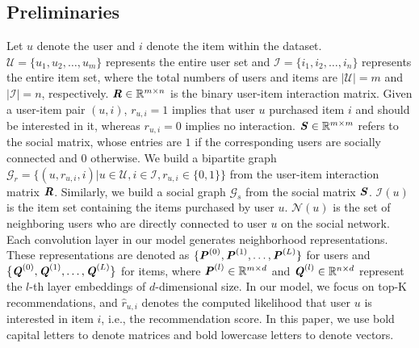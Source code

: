\documentclass[letterpaper]{article} %
\begin{document}
\subsection{Preliminaries}
Let $u$ denote the user and $i$ denote the item within the dataset. $\mathcal{U}=\{u_1,  u_2, \ldots, u_m\}$ represents the entire user set and $\mathcal{I}=\{i_1, i_2, \ldots, i_n\}$ represents the entire item set, where the total numbers of users and items are $|\mathcal{U}|=m$ and $|\mathcal{I}|=n$, respectively. $\textbf{\textit{R}} \in \mathbb{R}^{m\times n}$ is the binary user-item interaction matrix. Given a user-item pair $(u, i)$, $r_{u,i}=1$ implies that user $u$ purchased item $i$ and should be interested in it, whereas $r_{u,i}=0$ implies no interaction. $\textbf{\textit{S}} \in \mathbb{R}^{m\times m}$ refers to the social matrix, whose entries are $1$ if the corresponding users are socially connected and $0$ otherwise. We build a bipartite graph $\mathcal{G}_r=\{(u, r_{u,i}, i)|u\in \mathcal{U}, i\in \mathcal{I}, r_{u,i}\in \{0,1\}\}$ from the user-item interaction matrix $\textbf{\textit{R}}$. Similarly, we build a social graph $\mathcal{G}_s$ from the social matrix $\textbf{\textit{S}}$. $\mathcal{I}(u)$ is the item set containing the items purchased by user $u$. $\mathcal{N}(u)$ is the set of neighboring users who are directly connected to user $u$ on the social network. Each convolution layer in our model generates neighborhood representations. These representations are denoted as $\{\textbf{\textit{P}}^{(0)}, \textbf{\textit{P}}^{(1)}, \ldots, \textbf{\textit{P}}^{(L)}\}$ for users and $\{\textbf{\textit{Q}}^{(0)}, \textbf{\textit{Q}}^{(1)}, \ldots, \textbf{\textit{Q}}^{(L)}\}$ for items, where $\textbf{\textit{P}}^{(l)} \in \mathbb{R}^{m\times d}$ and $\textbf{\textit{Q}}^{(l)} \in \mathbb{R}^{n\times d}$ represent the $l$-th layer embeddings of $d$-dimensional size. In our model, we focus on top-K recommendations, and $\hat{r}_{u, i}$ denotes the computed likelihood that user $u$ is interested in item $i$, i.e., the recommendation score. In this paper, we use bold capital letters to denote matrices and bold lowercase letters to denote vectors.
\end{document}

